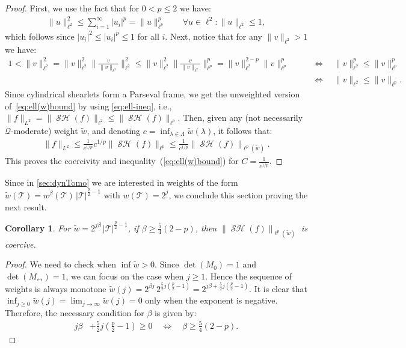 \documentclass[11pt,a4paper]{article}
\numberwithin{equation}{section}
\newtheorem{corollary}[theorem]{Corollary}
\newcommand{\dimFlip}{M_{\! \leftrightarrow}}
\newcommand{\mcQ}{\mathcal{Q}}  %
\newcommand{\msT}{\mathscr{T}} %
\DeclareMathOperator{\sh}{\mathcal{SH}}
\begin{document}
\begin{proof}
First, we use the fact that for $0 < p \leq 2$ 
we have:
\begin{align} \label{eq:l2<lp}
   \| u \|_{\ell^2}^2 \leq \sum_{i = 1}^\infty |u_i|^p = \| u \|_{\ell^p}^p \qquad \forall u \in \ell^2: \|u\|_{\ell^2} \leq 1,
\end{align}
which follows since $|u_i|^2 \leq |u_i|^p \leq 1$ for all $i$. %
Next, notice that for any $\|v\|_{\ell^2} > 1$ we have:
\begin{align}
    1 < \|v\|_{\ell^2}^2 = \|v\|_{\ell^2}^2 \| \tfrac{v}{\|v\|_{\ell^2}} \|_{\ell^2}^2 \leq \|v\|_{\ell^2}^2 \|\tfrac{v}{\|v\|_{\ell^2}} \|_{\ell^p}^p = \|v\|_{\ell^2}^{2-p} \|v \|_{\ell^p}^p \qquad
    &\Longleftrightarrow \quad \|v\|_{\ell^2}^p \leq \|v\|_{\ell^p}^p \nonumber \\
    &\Longleftrightarrow \quad \|v\|_{\ell^2}  \leq \|v\|_{\ell^p}. \label{eq:ell-ineq}
\end{align}
Since cylindrical shearlets form a Parseval frame, we get the unweighted version of~\eqref{eq:ell(w)bound} by using \eqref{eq:ell-ineq}, i.e., $\|f\|_{L^2} = \|\sh (f) \|_{\ell^2} \leq \|\sh (f) \|_{\ell^p}$. 
Then, given any (not necessarily $\mcQ$-moderate) weight $\tilde{w}$, and denoting $c = \inf_{\lambda \in \Lambda} \tilde{w}(\lambda)$, it follows that:
\begin{align*}
    \| f \|_{L^2} \leq \frac{1}{c^{1/p}} c^{1/p} \| \sh (f) \|_{\ell^p} \leq \frac{1}{c^{1/p}} \|\sh (f) \|_{\ell^p(\tilde{w})}.
\end{align*}
This proves the coercivity and inequality~(\ref{eq:ell(w)bound}) for $C = \frac{1}{c^{1/p}}$.
\end{proof}


Since in \cref{sec:dynTomo} we are interested in weights of the form $\tilde{w}(\msT) = w^\beta(\msT) \, |\msT|^{\frac{p}{2}-1}$ with $w(\msT) = 2^j$, we conclude this section proving the next result.

\begin{corollary} \label{cor:betaBound}
For $\tilde{w} = 2^{j\beta} \, |\msT|^{\frac{p}{2}-1}$, if $\beta \geq \frac{5}{4}(2-p)$, then $\|\sh (f) \|_{\ell^p(\tilde{w})}$ is coercive.
\end{corollary}
\begin{proof}
We need to check when $\inf \tilde{w} > 0$. Since $\det(M_0) = 1$ and $\det(\dimFlip) = 1$, we can focus on the case when $j \geq 1$. Hence the sequence of weights is always monotone 
$\tilde{w}(j) = 2^{\beta j} \, 2^{\frac{5}{2}j \left( \frac{p}{2}-1 \right)} = 2^{j\beta + \frac{5}{2} j \left( \frac{p}{2}-1 \right)}$. It is clear that $\inf_{j \geq 0}\tilde{w}(j) = \lim_{j \to \infty}\tilde{w}(j) = 0$ only when the exponent is negative. Therefore, the necessary condition for $\beta$ is given by:
\begin{align*}
j\beta &+ \frac{5}{2} j \left( \frac{p}{2}-1 \right) \geq 0 \quad
    \Longleftrightarrow \quad \beta \geq \frac{5}{4}(2-p).
\end{align*}
\end{proof}
\end{document}
